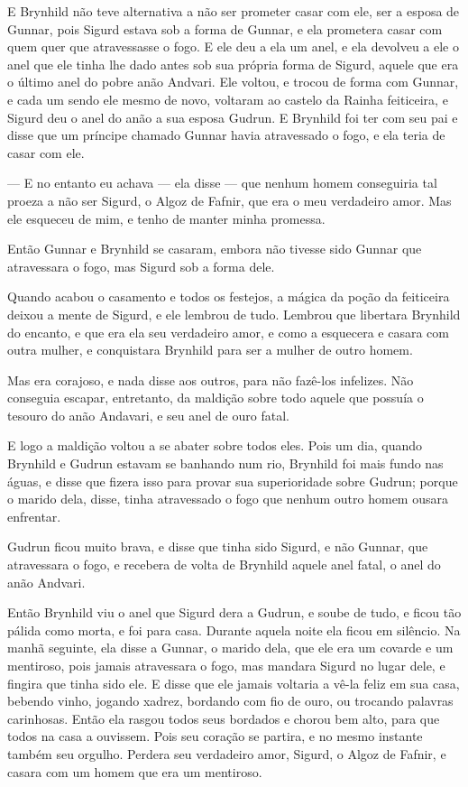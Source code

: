 E Brynhild não teve alternativa a não ser prometer casar com ele, ser
a esposa de Gunnar, pois Sigurd estava sob a forma de Gunnar, e ela
prometera casar com quem quer que atravessasse o fogo. E ele deu a
ela um anel, e ela devolveu a ele o anel que ele tinha lhe dado antes
sob sua própria forma de Sigurd, aquele que era o último anel do
pobre anão Andvari. Ele voltou, e trocou de forma com Gunnar, e cada
um sendo ele mesmo de novo, voltaram ao castelo da Rainha feiticeira,
e Sigurd deu o anel do anão a sua esposa Gudrun. E Brynhild foi ter
com seu pai e disse que um príncipe chamado Gunnar havia atravessado
o fogo, e ela teria de casar com ele. 

— E no entanto eu achava — ela disse — que nenhum homem conseguiria
tal proeza a não ser Sigurd, o Algoz de Fafnir, que era o meu
verdadeiro amor. Mas ele esqueceu de mim, e tenho de manter minha
promessa. 

Então Gunnar e Brynhild se casaram, embora não tivesse sido Gunnar que
atravessara o fogo, mas Sigurd sob a forma dele. 

Quando acabou o casamento e todos os festejos, a mágica da poção da
feiticeira deixou a mente de Sigurd, e ele lembrou de tudo. Lembrou
que libertara Brynhild do encanto, e que era ela seu verdadeiro amor,
e como a esquecera e casara com outra mulher, e conquistara Brynhild
para ser a mulher de outro homem. 

Mas era corajoso, e nada disse aos outros, para não fazê-los
infelizes. Não conseguia escapar, entretanto, da maldição sobre todo
aquele que possuía o tesouro do anão Andavari, e seu anel de ouro
fatal. 

E logo a maldição voltou a se abater sobre todos eles. Pois um dia,
quando Brynhild e Gudrun estavam se banhando num rio, Brynhild foi
mais fundo nas águas, e disse que fizera isso para provar sua
superioridade sobre Gudrun; porque o marido dela, disse, tinha
atravessado o fogo que nenhum outro homem ousara enfrentar. 

Gudrun ficou muito brava, e disse que tinha sido Sigurd, e não Gunnar,
que atravessara o fogo, e recebera de volta de Brynhild aquele anel
fatal, o anel do anão Andvari. 

Então Brynhild viu o anel que Sigurd dera a Gudrun, e soube de tudo, e
ficou tão pálida como morta, e foi para casa. Durante aquela noite
ela ficou em silêncio. Na manhã seguinte, ela disse a Gunnar, o
marido dela, que ele era um covarde e um mentiroso, pois jamais
atravessara o fogo, mas mandara Sigurd no lugar dele, e fingira que
tinha sido ele. E disse que ele jamais voltaria a vê-la feliz em sua
casa, bebendo vinho, jogando xadrez, bordando com fio de ouro, ou
trocando palavras carinhosas. Então ela rasgou todos seus bordados e
chorou bem alto, para que todos na casa a ouvissem. Pois seu coração
se partira, e no mesmo instante também seu orgulho. Perdera seu
verdadeiro amor, Sigurd, o Algoz de Fafnir, e casara com um homem que
era um mentiroso. 

